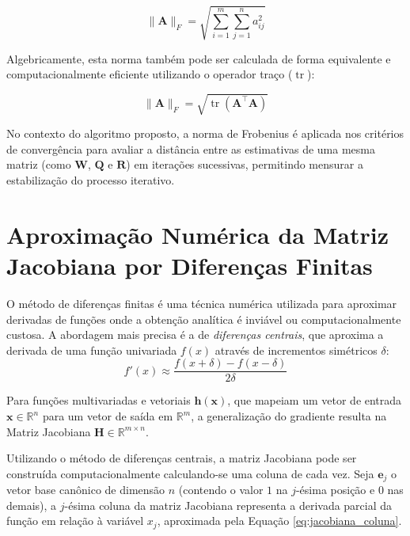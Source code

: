 \documentclass[journal]{IEEEtran}
\begin{document}
\begin{appendices}
\begin{equation}
    \label{eq:frob_def1}
    \|\mathbf{A}\|_F = \sqrt{\sum_{i=1}^{m} \sum_{j=1}^{n} a_{ij}^2}
\end{equation}

Algebricamente, esta norma também pode ser calculada de forma equivalente e computacionalmente eficiente utilizando o operador traço ($\operatorname{tr}$):

\begin{equation}
    \label{eq:frob_def2}
    \|\mathbf{A}\|_F = \sqrt{\operatorname{tr}(\mathbf{A}^\top \mathbf{A})}
\end{equation}

No contexto do algoritmo proposto, a norma de Frobenius é aplicada nos critérios de convergência para avaliar a distância entre as estimativas de uma mesma matriz (como $\mathbf{W}$, $\mathbf{Q}$ e $\mathbf{R}$) em iterações sucessivas, permitindo mensurar a estabilização do processo iterativo.

\section{Aproximação Numérica da Matriz Jacobiana por Diferenças Finitas}
\label{app:jacobiana_num}

O método de diferenças finitas é uma técnica numérica utilizada para aproximar derivadas de funções onde a obtenção analítica é inviável ou computacionalmente custosa. A abordagem mais precisa é a de \textit{diferenças centrais}, que aproxima a derivada de uma função univariada $f(x)$ através de incrementos simétricos $\delta$:
\begin{equation}
    f'(x) \approx \frac{f(x+\delta) - f(x-\delta)}{2\delta}
\end{equation}

Para funções multivariadas e vetoriais $\mathbf{h}(\mathbf{x})$, que mapeiam um vetor de entrada $\mathbf{x} \in \mathbb{R}^n$ para um vetor de saída em $\mathbb{R}^m$, a generalização do gradiente resulta na Matriz Jacobiana $\mathbf{H} \in \mathbb{R}^{m \times n}$.

Utilizando o método de diferenças centrais, a matriz Jacobiana pode ser construída computacionalmente calculando-se uma coluna de cada vez. Seja $\mathbf{e}_j$ o vetor base canônico de dimensão $n$ (contendo o valor $1$ na $j$-ésima posição e $0$ nas demais), a $j$-ésima coluna da matriz Jacobiana representa a derivada parcial da função em relação à variável $x_j$, aproximada pela Equação \eqref{eq:jacobiana_coluna}.


\end{appendices}
\end{document}
